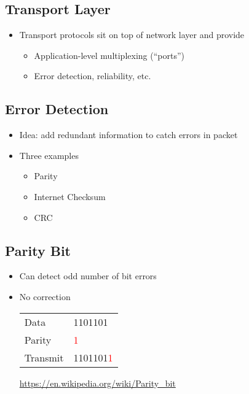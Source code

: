 \subsection{Transport Layer}
\begin{itemize}
    \item Transport protocols sit on top of network layer and provide
          \begin{itemize}[nosep]
              \item Application-level multiplexing (``ports'')
              \item Error detection, reliability, etc.
          \end{itemize}
\end{itemize}
\subsection{Error Detection}
\begin{itemize}[nosep]
    \item Idea: add redundant information to catch errors in packet
    \item Three examples
          \begin{itemize}[nosep]
              \item Parity
              \item Internet Checksum
              \item CRC
          \end{itemize}
\end{itemize}
\subsection{Parity Bit}
\begin{itemize}[nosep]
    \item Can detect odd number of bit errors
    \item No correction

          \begin{table}[H]
              \begin{tabular}{ll}
                  Data     & 1101101                   \\
                  Parity   & \textcolor{red}{1}        \\
                  Transmit & 1101101\textcolor{red}{1}
              \end{tabular}
          \end{table}
          \url{https://en.wikipedia.org/wiki/Parity_bit}
\end{itemize}

